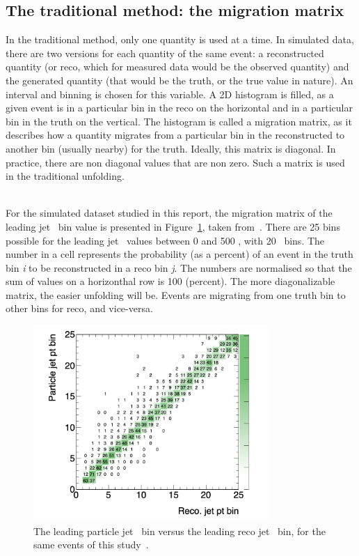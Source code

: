 \subsection{The traditional method: the migration matrix}
\label{sec:UnfoldingMigrationMatrix}

In the traditional method, only one quantity is used at a time. In simulated data, there are two versions for each quantity of the same event: a reconstructed quantity (or reco, which for measured data would be the observed quantity) and the generated quantity (that would be the truth, or the true value in nature). An interval and binning is chosen for this variable. A 2D histogram is filled, as a given event is in a particular bin in the reco on the horizontal and in a particular bin in the truth on the vertical. The histogram is called a migration matrix, as it describes how a quantity migrates from a particular bin in the reconstructed to another bin (usually nearby) for the truth. Ideally, this matrix is diagonal. In practice, there are non diagonal values that are non zero. Such a matrix is used in the traditional unfolding. 

\ \\For the simulated dataset studied in this report, the migration matrix of the leading jet \pt~bin value is presented in Figure~\ref{fig:MigrationMatrix}, taken from~\cite{ReportYichenLi}. There are 25 bins possible for the leading jet \pt~values between 0 and 500 \GeV, with 20 \GeV~bins. The number in a cell represents the probability (as a percent) of an event in the truth bin \emph{i} to be reconstructed in a reco bin \emph{j}. The numbers are normalised so that the sum of values on a horizonthal row is 100 (percent). The more diagonalizable matrix, the easier unfolding will be. Events are migrating from one truth bin to other bins for reco, and vice-versa.

\begin{figure}[h]
  \centering
  \includegraphics[width=0.8\textwidth]{../presentation/plots/jetPt_migration_matrix.png}
  \caption{The leading particle jet \pt~bin versus the leading reco jet \pt~bin, for the same events of this study~\cite{ReportYichenLi}.}
  \label{fig:MigrationMatrix}
\end{figure}

